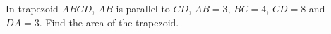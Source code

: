 In trapezoid $ABCD$, $AB$ is parallel to $CD$, $AB=3$, $BC=4$, $CD=8$ and $DA=3$. Find the area of the trapezoid.
